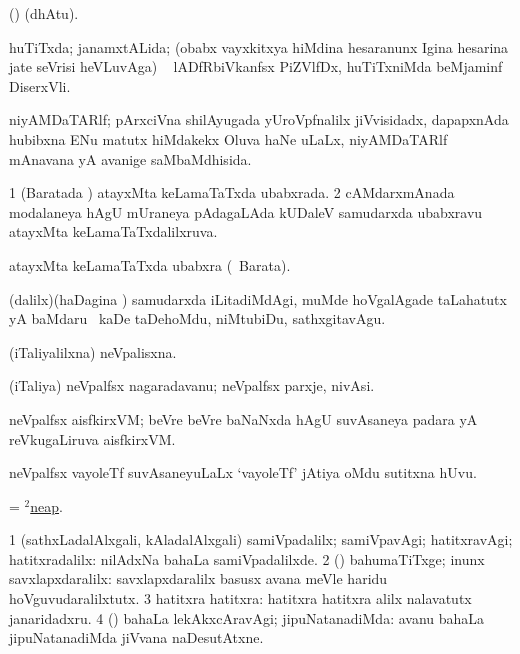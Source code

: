 \bentry
{}
\gl{\saMkeV}
\bmng
(\ravi)  (dhAtu). 
\emng
\eentry

\bentry
{}
\gl{\gu}
\bmng
huTiTxda; janamxtALida; (obabx vayxkitxya hiMdina hesaranunx Igina hesarina jate seVrisi heVLuvAga) \udA\  lADfRbiVkanfsx PiZVlfDx, huTiTxniMda beMjaminf DiserxVli. 
\emng
\eentry

\bentry
{}
\gl{\gu}
\bmng
niyAMDaTARlf; pArxciVna shilAyugada yUroVpfnalilx jiVvisidadx, dapapxnAda hubibxna ENu matutx hiMdakekx Oluva haNe uLaLx, niyAMDaTARlf mAnavana yA avanige saMbaMdhisida. 
\emng
\eentry

\bentry
{}
\gl{\gu}
\bmng
\bnum
\num{1} (Baratada \vi) atayxMta keLamaTaTxda ubabxrada. 
\num{2} cAMdarxmAnada modalaneya hAgU mUraneya pAdagaLAda kUDaleV samudarxda ubabxravu atayxMta keLamaTaTxdalilxruva. 
\enum
\emng
\eentry

\bentry
{}
\gl{\nA}
\bmng
atayxMta keLamaTaTxda ubabxra (\da\ Barata). 
\emng
\eentry

\bentry
{}
\gl{\sakirx}
\bmng
(\kaparx dalilx)(haDagina \vi) samudarxda iLitadiMdAgi, muMde hoVgalAgade taLahatutx yA baMdaru \mo\ kaDe taDehoMdu, niMtubiDu, sathxgitavAgu. 
\emng
\eentry

\bentry
{}
\gl{\gu}
\bmng
(iTaliyalilxna) neVpalisxna. 
\emng
\eentry

\bentry
{}
\gl{\nA}
\bmng
(iTaliya) neVpalfsx nagaradavanu; neVpalfsx parxje, nivAsi. 
\emng
\eentry

\bentry
{}
\gl{\nA}
\bmng
neVpalfsx aisfkirxVM; beVre beVre baNaNxda hAgU suvAsaneya padara yA reVkugaLiruva aisfkirxVM. 
\emng
\eentry

\bentry
{}
\gl{\nA}
\bmng
neVpalfsx vayoleTf suvAsaneyuLaLx `vayoleTf' jAtiya oMdu sutitxna hUvu. 
\emng
\eentry

\bentry
{}
\gl{\nA}
\bmng
= \hyperlink{neap(2)}{$^2$neap}. 
\emng
\eentry

\bentry
{}
\gl{\kirxvi}
\bmng
\bnum
\num{1} (sathxLadalAlxgali, kAladalAlxgali) samiVpadalilx; samiVpavAgi; hatitxravAgi; hatitxradalilx:  nilAdxNa bahaLa samiVpadalilxde. 
\num{2} (\pArxparx) bahumaTiTxge; inunx savxlapxdaralilx:  savxlapxdaralilx basusx avana meVle haridu hoVguvudaralilxtutx. 
\num{3} hatitxra hatitxra:  hatitxra hatitxra alilx nalavatutx janaridadxru. 
\num{4} (\pArxparx) bahaLa lekAkxcAravAgi; jipuNatanadiMda:  avanu bahaLa jipuNatanadiMda jiVvana naDesutAtxne. 
\enum
\emng

